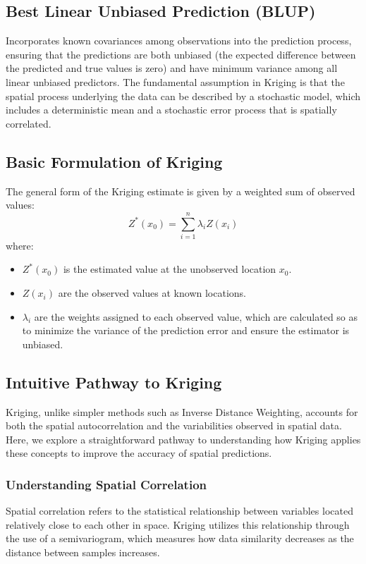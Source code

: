 \documentclass{article}
\begin{document}
\subsection{Best Linear Unbiased Prediction (BLUP)}
Incorporates known covariances among observations into the prediction process, ensuring that the predictions are both unbiased (the expected difference between the predicted and true values is zero) and have minimum variance among all linear unbiased predictors. The fundamental assumption in Kriging is that the spatial process underlying the data can be described by a stochastic model, which includes a deterministic mean and a stochastic error process that is spatially correlated.

\subsection{Basic Formulation of Kriging}
The general form of the Kriging estimate is given by a weighted sum of observed values:
\[
Z^*(x_0) = \sum_{i=1}^n \lambda_i Z(x_i)
\]
where:
\begin{itemize}
    \item \(Z^*(x_0)\) is the estimated value at the unobserved location \(x_0\).
    \item \(Z(x_i)\) are the observed values at known locations.
    \item \(\lambda_i\) are the weights assigned to each observed value, which are calculated so as to minimize the variance of the prediction error and ensure the estimator is unbiased.
\end{itemize}

\subsection{Intuitive Pathway to Kriging}

Kriging, unlike simpler methods such as Inverse Distance Weighting, accounts for both the spatial autocorrelation and the variabilities observed in spatial data. Here, we explore a straightforward pathway to understanding how Kriging applies these concepts to improve the accuracy of spatial predictions.

\subsubsection{Understanding Spatial Correlation}
Spatial correlation refers to the statistical relationship between variables located relatively close to each other in space. Kriging utilizes this relationship through the use of a semivariogram, which measures how data similarity decreases as the distance between samples increases.
\end{document}
